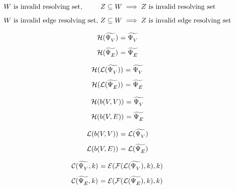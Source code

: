 \begin{theorem}
	\[\begin{array}{l@{\ }l}
		W \text{ is invalid resolving set}, &Z \subseteq W \implies Z \text{ is invalid resolving set} \\ [8pt]
		W \text{ is invalid edge resolving set}, &Z \subseteq W \implies Z \text{ is invalid edge resolving set}
	\end{array}\]
\end{theorem}

\begin{theorem}
	\[\begin{array}{l@{\ }l}
		\Hcal(\nonresolving{V}) &= \nonresolving{V} \\ [8pt]
		\Hcal(\nonresolving{E}) &= \nonresolving{E}
	\end{array}\]
\end{theorem}

\begin{corollary}
	\[\begin{array}{l@{\ }l}
		\Hcal(\Lcal(\nonresolving{V})) &= \nonresolving{V} \\ [8pt]
		\Hcal(\Lcal(\nonresolving{E})) &= \nonresolving{E}
	\end{array}\]
\end{corollary}

\begin{theorem}
	\[\begin{array}{l@{\ }l}
		\Hcal(b(V,V)) &= \nonresolving{V} \\ [8pt]
		\Hcal(b(V,E)) &= \nonresolving{E}
	\end{array}\]
\end{theorem}

\begin{corollary}
	\label{cor:resolving-construct}
	\[\begin{array}{l@{\ }l}
		\Lcal(b(V,V)) &= \Lcal(\nonresolving{V}) \\ [8pt]
		\Lcal(b(V,E)) &= \Lcal(\nonresolving{E})
	\end{array}\]
\end{corollary}

\begin{corollary}
	\[\begin{array}{l@{\ }l}
		\Ccal(\nonresolving{V},k) &= \Ecal(\Fcal(\Lcal(\nonresolving{V}),k),k) \\ [8pt]
		\Ccal(\nonresolving{E},k) &= \Ecal(\Fcal(\Lcal(\nonresolving{E}),k),k)
	\end{array}\]
\end{corollary}

